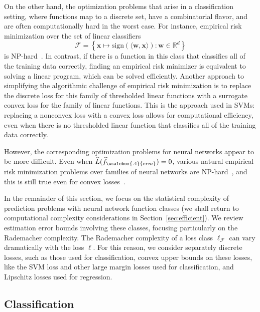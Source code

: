 On the other hand, the optimization problems that arise in a classification setting, where functions map to a discrete set, have a combinatorial flavor, and are often computationally hard in the worst case. For instance, empirical risk minimization over the set of linear classifiers
  \[
    {\mathcal F} = \left\{{\boldsymbol x}\mapsto\mathrm{sign}\left(\langle {\boldsymbol w}, {\boldsymbol x}\rangle\right)
        :{\boldsymbol w}\in{\mathbb R}^d\right\}
  \]
is NP-hard~\cite{jp-dhp-78,gj-ci-79}.  In contrast, if there is a function in this class that classifies all of the training data correctly, finding an empirical risk minimizer is equivalent to solving a linear program, which can be solved efficiently. Another approach to simplifying the algorithmic challenge of empirical risk minimization is to replace the discrete loss for this family of thresholded linear functions with a surrogate convex loss for the family of linear functions. This is the approach used in SVMs: replacing a nonconvex loss with a convex loss allows for computational efficiency, even when there is no thresholded linear function that classifies all of the training data correctly.

However, the corresponding optimization problems for neural networks appear to be more difficult. Even when
$\widehat L(\widehat{f}_{\scalebox{.4}{erm}})=0$, various natural empirical risk minimization problems over families of neural networks are NP-hard~\cite{j-nndcl-90,br-t3nnn-92,dss-ctnncaf-95}, and this is still true even for convex losses~\cite{v-itnnsse-98,bbd-hrnnap-02}.

In the remainder of this section, we focus on the statistical complexity of prediction problems with neural network function classes (we shall return to computational complexity considerations in
Section~\ref{sec:efficient}). We review estimation error bounds involving these classes, focusing particularly on the Rademacher complexity. The Rademacher complexity of a loss class $\ell_{{\mathcal F}}$ can vary dramatically with the loss $\ell$.  For this reason, we consider separately discrete losses, such as those used for classification, convex upper bounds on these losses, like the SVM loss and other large margin losses used for classification, and Lipschitz losses used for regression.

\subsection{Classification}

